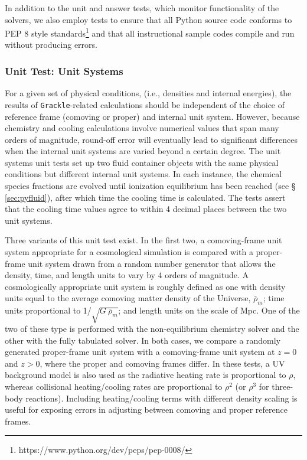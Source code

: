 In addition to the unit and answer tests, which monitor functionality
of the solvers, we also employ tests to ensure that all Python source
code conforms to PEP 8 style
standards\footnote{https://www.python.org/dev/peps/pep-0008/} and that
all instructional sample codes compile and run without producing
errors.

\subsubsection{Unit Test: Unit Systems}
\label{sec:test-units}

For a given set of physical conditions, (i.e., densities and internal
energies), the results of \texttt{Grackle}-related calculations should be
independent of the choice of reference frame (comoving or proper) and
internal unit system.  However, because chemistry and cooling
calculations involve numerical values that span many orders of
magnitude, round-off error will eventually lead to significant
differences when the internal unit systems are varied beyond a certain
degree.  The unit systems unit tests set up two fluid container
objects with the same physical conditions but different internal unit
systems.  In each instance, the chemical species fractions are evolved
until ionization equilibrium has been reached (see \S
\ref{sec:pyfluid}), after which time the cooling time is calculated.
The tests assert that the cooling time values agree to within 4
decimal places between the two unit systems.

Three variants of this unit test exist.  In the first two, a
comoving-frame unit system appropriate for a cosmological simulation
is compared with a proper-frame unit system drawn from a random number
generator that allows the density, time, and length units to vary by 4
orders of magnitude.  A cosmologically appropriate unit system is
roughly defined as one with density units equal to the average
comoving matter density of the Universe, $\bar{\rho}_{m}$; time units
proportional to 1/$\sqrt{G\ \bar{\rho}_{m}}$; and length units on the
scale of Mpc.  One of the two of these type is performed with the
non-equilibrium chemistry solver and the other with the fully
tabulated solver.  In both cases, we compare a randomly generated
proper-frame unit system with a comoving-frame unit system at $z = 0$
and $z > 0$, where the proper and comoving frames differ.  In these
tests, a UV background model is also used as the radiative heating
rate is proportional to $\rho$, whereas collisional heating/cooling
rates are proportional to $\rho^{2}$ (or $\rho^{3}$ for three-body
reactions).  Including heating/cooling terms with different density
scaling is useful for exposing errors in adjusting between comoving
and proper reference frames.

